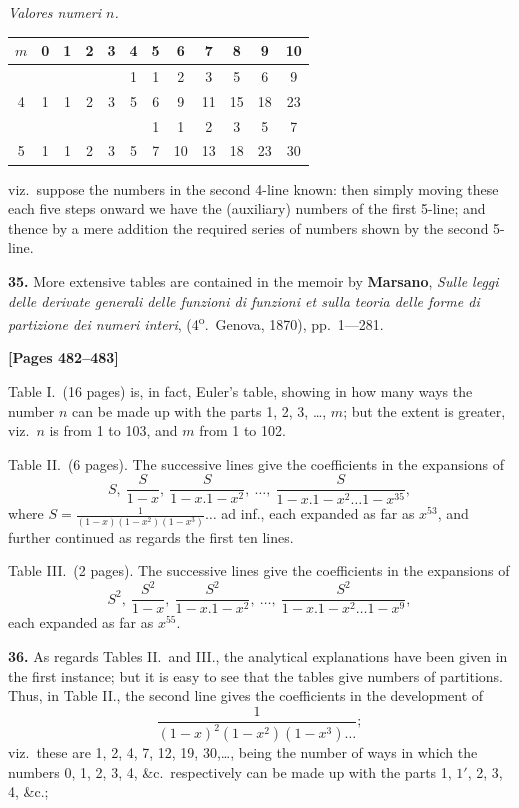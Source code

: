 \documentclass[11pt,a4paper]{article}
\begin{document}
\begin{center}
\textit{Valores numeri $n$.}
\begin{tabular}{c|ccccccccccc}
$m$ & 0 & 1 & 2 & 3 & 4 & 5 & 6 & 7 & 8 & 9 & 10 \\
\hline
 & & & & & 1 & 1 & 2 & 3 & 5 & 6 & 9 \\
4 & 1 & 1 & 2 & 3 & 5 & 6 & 9 & 11 & 15 & 18 & 23 \\
 & & & & & & 1 & 1 & 2 & 3 & 5 & 7 \\
5 & 1 & 1 & 2 & 3 & 5 & 7 & 10 & 13 & 18 & 23 & 30 \\
\end{tabular}
\end{center}

viz.\ suppose the numbers in the second 4-line known: then simply moving these each
five steps onward we have the (auxiliary) numbers of the first 5-line; and thence
by a mere addition the required series of numbers shown by the second 5-line.

\textbf{35.} More extensive tables are contained in the memoir by
\quad\textbf{Marsano}, \textit{Sulle leggi delle derivate generali delle funzioni di funzioni et sulla teoria delle forme di partizione dei numeri interi},
(4\textsuperscript{o}.\ Genova, 1870), pp.\ 1---281.

\newpage
\textbf{[Pages 482--483]}

Table I.\ (16 pages) is, in fact, Euler's table, showing in how many ways the
number $n$ can be made up with the parts 1, 2, 3, \ldots, $m$; but the extent is greater,
viz.\ $n$ is from 1 to 103, and $m$ from 1 to 102.

Table II.\ (6 pages). The successive lines give the coefficients in the expansions of
\[S,\ \frac{S}{1-x},\ \frac{S}{1-x.1-x^{2}},\ \ldots,\ \frac{S}{1-x.1-x^{2}\ldots 1-x^{35}},\]
where $S = \frac{1}{(1-x)(1-x^{2})(1-x^{3})}\ldots$ ad inf.,
each expanded as far as $x^{53}$, and further continued as regards the first ten lines.

Table III.\ (2 pages). The successive lines give the coefficients in the expansions of
\[S^{2},\ \frac{S^{2}}{1-x},\ \frac{S^{2}}{1-x.1-x^{2}},\ \ldots,\ \frac{S^{2}}{1-x.1-x^{2}\ldots 1-x^{9}},\]
each expanded as far as $x^{55}$.

\textbf{36.} As regards Tables II.\ and III., the analytical explanations have been given
in the first instance; but it is easy to see that the tables give numbers of partitions.
Thus, in Table II., the second line gives the coefficients in the development of
\[\frac{1}{(1-x)^{2}(1-x^{2})(1-x^{3})\ldots};\]
viz.\ these are 1, 2, 4, 7, 12, 19, 30,\ldots, being the number of ways in which the
numbers 0, 1, 2, 3, 4, \&c.\ respectively can be made up with the parts 1, $1'$, 2, 3,
4, \&c.;
\end{document}

